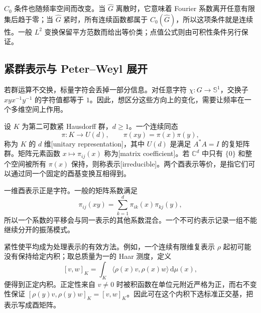 \(C_0\) 条件也随频率空间而改变。当 \(\widehat G\) 离散时，它意味着 Fourier 系数离开任意有限集后趋于零；当 \(\widehat G\) 紧时，所有连续函数都属于 \(C_0(\widehat G)\)，所以这项条件就是连续性。一般 \(L^2\) 变换保留平方范数而给出等价类；点值公式则由可积性条件另行保证。

\subsection{紧群表示与 Peter–Weyl 展开}
\label{b2:subsec:I20503}

若群运算不交换，标量字符会丢掉一部分信息。对任意字符 \(\chi:G\to\mathbb S^1\)，交换子 \(xyx^{-1}y^{-1}\) 的字符值都等于 \(1\)。因此，想区分这些方向上的变化，需要让频率在一个多维空间上作用。

\begin{definition}[有限维酉表示与矩阵系数]
\label{b2:def:I5-unitary-representation}
设 \(K\) 为第二可数紧 Hausdorff 群，\(d\ge1\)。一个连续同态
\[
 \pi:K\longrightarrow U(d),\qquad
 \pi(xy)=\pi(x)\pi(y),
\]
称为 \(K\) 的 \(d\) 维[unitary representation]，其中 \(U(d)\) 是满足 \(A^*A=I\) 的复矩阵群。矩阵元素函数 \(x\mapsto\pi_{ij}(x)\) 称为[matrix coefficient]。若 \(\mathbb C^d\) 中只有 \(\{0\}\) 和整个空间被所有 \(\pi(x)\) 保持，则称表示[irreducible]。两个酉表示等价，是指它们可以通过同一个固定的酉基变换互相得到。
\end{definition}

一维酉表示正是字符。一般的矩阵系数满足
\[
 \pi_{ij}(xy)=\sum_{k=1}^d\pi_{ik}(x)\pi_{kj}(y),
\]
所以一个系数的平移会与同一表示的其他系数混合。一个不可约表示记录一组不能继续分开的振荡模式。

紧性使平均成为处理表示的有效方法。例如，一个连续有限维复表示 \(\rho\) 起初可能没有保持给定内积；取总质量为一的 Haar 测度，定义
\[
 [v,w]_K=\int_K\langle\rho(x)v,\rho(x)w\rangle\,\mathrm d\mu(x),
\]
便得到正定内积。正定性来自 \(v\ne0\) 时被积函数在单位元附近严格为正，而右不变性保证 \([\rho(y)v,\rho(y)w]_K=[v,w]_K\)。因此可在这个内积下选标准正交基，把表示写成酉矩阵。

